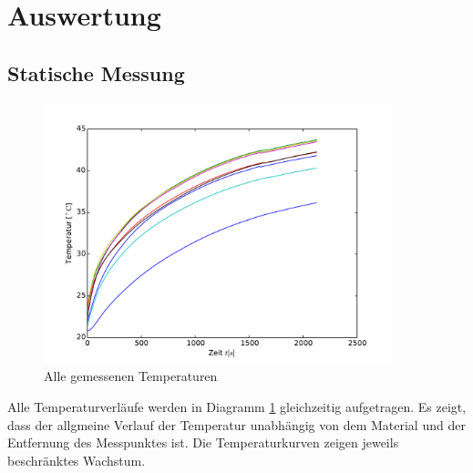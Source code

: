 \newpage
\section{Auswertung}
\label{sec:Auswertung}
\subsection{Statische Messung}
\begin{figure}[h!]
	\label{fig:overview1}
	\centering
	\includegraphics[width=0.9\textwidth]{Bilder/M1_Overview.pdf}
	\caption{Alle gemessenen Temperaturen}
\end{figure}
Alle Temperaturverläufe werden in Diagramm \ref{fig:overview1} gleichzeitig aufgetragen. Es zeigt, dass der allgmeine Verlauf der Temperatur unabhängig von dem Material und der Entfernung des Messpunktes ist. Die Temperaturkurven zeigen jeweils beschränktes Wachstum.

